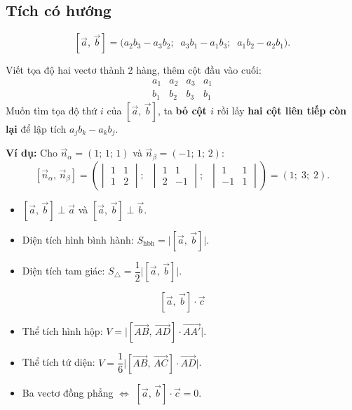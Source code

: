 \documentclass[12pt,a4paper]{article}
\begin{document}
\subsection{Tích có hướng}

\begin{congthuc}
  \[
    [\vec{a},\, \vec{b}]
    = \bigl(a_2 b_3 - a_3 b_2;\;\; a_3 b_1 - a_1 b_3;\;\; a_1 b_2 - a_2 b_1\bigr).
  \]
\end{congthuc}

\begin{phuongphap}[title={Cách nhớ nhanh tích có hướng}]
  Viết tọa độ hai vectơ thành 2 hàng, thêm cột đầu vào cuối:
  \[
    \begin{array}{cccc}
      a_1 & a_2 & a_3 & a_1 \\
      b_1 & b_2 & b_3 & b_1
    \end{array}
  \]
  Muốn tìm tọa độ thứ $i$ của $[\vec{a},\, \vec{b}]$, ta \textbf{bỏ cột $i$} rồi lấy \textbf{hai cột liên tiếp còn lại} để lập tích $a_j b_k - a_k b_j$.

  \medskip
  \textbf{Ví dụ:} Cho $\vec{n}_\alpha = (1;\, 1;\, 1)$ và $\vec{n}_\beta = (-1;\, 1;\, 2)$:
  \[
    [\vec{n}_\alpha,\, \vec{n}_\beta]
    = \left(
      \begin{vmatrix} 1 & 1 \\ 1 & 2 \end{vmatrix};\;\;
      \begin{vmatrix} 1 & 1 \\ 2 & -1 \end{vmatrix};\;\;
      \begin{vmatrix} 1 & 1 \\ -1 & 1 \end{vmatrix}
    \right)
    = (1;\; 3;\; 2).
  \]
\end{phuongphap}

\begin{tinhchat}
  \begin{itemize}
    \item $[\vec{a},\, \vec{b}] \perp \vec{a}$ và $[\vec{a},\, \vec{b}] \perp \vec{b}$.
    \item Diện tích hình bình hành: $S_{\text{hbh}} = \bigl|[\vec{a},\, \vec{b}]\bigr|$.
    \item Diện tích tam giác: $S_{\triangle} = \dfrac{1}{2}\bigl|[\vec{a},\, \vec{b}]\bigr|$.
  \end{itemize}
\end{tinhchat}

\begin{congthuc}[title={Tích hỗn tạp}]
  \[
    [\vec{a},\, \vec{b}] \cdot \vec{c}
  \]
  \begin{itemize}
    \item Thể tích hình hộp: $V = \bigl|[\overrightarrow{AB},\, \overrightarrow{AD}] \cdot \overrightarrow{AA'}\bigr|$.
    \item Thể tích tứ diện: $V = \dfrac{1}{6}\bigl|[\overrightarrow{AB},\, \overrightarrow{AC}] \cdot \overrightarrow{AD}\bigr|$.
    \item Ba vectơ đồng phẳng $\Leftrightarrow$ $[\vec{a},\, \vec{b}] \cdot \vec{c} = 0$.
  \end{itemize}
\end{congthuc}
\end{document}
